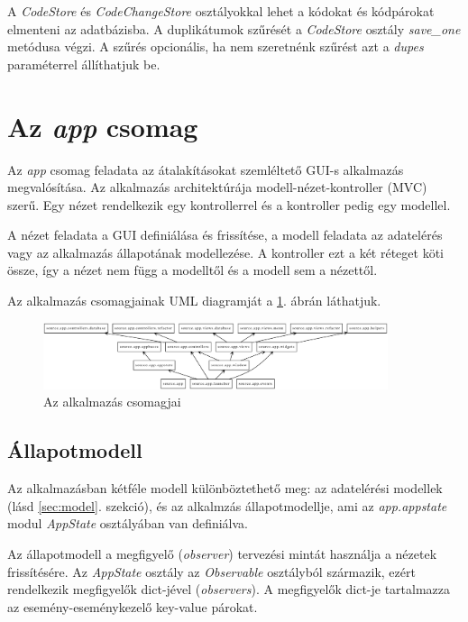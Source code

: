 A \emph{CodeStore} és \emph{CodeChangeStore} osztályokkal lehet a kódokat és kódpárokat
elmenteni az adatbázisba.
A duplikátumok szűrését a \emph{CodeStore} osztály \emph{save\_one} metódusa végzi.
A szűrés opcionális, ha nem szeretnénk szűrést azt a \emph{dupes} paraméterrel állíthatjuk be.


\section{Az \emph{app} csomag}

Az \emph{app} csomag feladata az átalakításokat szemléltető GUI-s alkalmazás megvalósítása.
Az alkalmazás architektúrája modell-nézet-kontroller (MVC) szerű.
Egy nézet rendelkezik egy kontrollerrel és a kontroller pedig egy modellel.

A nézet feladata a GUI definiálása és frissítése,
a modell feladata az adatelérés vagy az alkalmazás állapotának modellezése.
A kontroller ezt a két réteget köti össze,
így a nézet nem függ a modelltől és a modell sem a nézettől.

Az alkalmazás csomagjainak UML diagramját a \ref{fig:app_packages}. ábrán láthatjuk.

\begin{figure}[H]
	\centering
	\includegraphics[width=0.9\textwidth]{images/uml/apppackages.eps}
	\caption{\label{fig:app_packages}Az alkalmazás csomagjai}
\end{figure}

\subsection{Állapotmodell}
\label{subsec:appstate}

Az alkalmazásban kétféle modell különböztethető meg:
az adatelérési modellek (lásd \ref{sec:model}. szekció),
és az alkalmzás állapotmodellje, ami az \emph{app.appstate} modul 
\emph{AppState} osztályában van definiálva.

Az állapotmodell a megfigyelő (\emph{observer}) tervezési mintát használja a nézetek frissítésére.
Az \emph{AppState} osztály az \emph{Observable} osztályból származik,
ezért rendelkezik megfigyelők dict-jével (\emph{observers}).
A megfigyelők dict-je tartalmazza az esemény-eseménykezelő key-value párokat.

